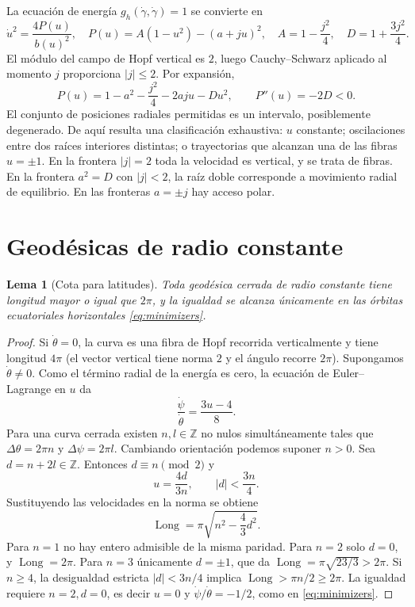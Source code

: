 \documentclass[11pt,a4paper]{article}
\newtheorem{lemma}[theorem]{Lema}
\theoremstyle{remark}\newtheorem{remark}[theorem]{Observación}
\newcommand{\Z}{\mathbb Z}
\newcommand{\Len}{\operatorname{Long}}
\begin{document}
La ecuación de energía $g_h(\dot\gamma,\dot\gamma)=1$ se convierte en
\begin{equation}\label{eq:radial}
\boxed{\dot u^2=\frac{4P(u)}{b(u)^2},\quad P(u)=A(1-u^2)-(a+ju)^2,\quad A=1-\frac{j^2}{4},\quad D=1+\frac{3j^2}{4}.}
\end{equation}
El módulo del campo de Hopf vertical es $2$, luego Cauchy--Schwarz aplicado al momento $j$ proporciona $|j|\leq2$. Por expansión,
\begin{equation}\label{eq:quad}
P(u)=1-a^2-\frac{j^2}{4}-2aju-Du^2,\qquad P''(u)=-2D<0.
\end{equation}
El conjunto de posiciones radiales permitidas es un intervalo, posiblemente degenerado. De aquí resulta una clasificación exhaustiva: $u$ constante; oscilaciones entre dos raíces interiores distintas; o trayectorias que alcanzan una de las fibras $u=\pm1$. En la frontera $|j|=2$ toda la velocidad es vertical, y se trata de fibras. En la frontera $a^2=D$ con $|j|<2$, la raíz doble corresponde a movimiento radial de equilibrio. En las fronteras $a=\pm j$ hay acceso polar.

\section{Geodésicas de radio constante}
\begin{lemma}[Cota para latitudes]\label{lem:lat}
Toda geodésica cerrada de radio constante tiene longitud mayor o igual que $2\pi$, y la igualdad se alcanza únicamente en las órbitas ecuatoriales horizontales \eqref{eq:minimizers}.
\end{lemma}
\begin{proof}
Si $\dot\theta=0$, la curva es una fibra de Hopf recorrida verticalmente y tiene longitud $4\pi$ (el vector vertical tiene norma $2$ y el ángulo recorre $2\pi$). Supongamos $\dot\theta\ne0$. Como el término radial de la energía es cero, la ecuación de Euler--Lagrange en $u$ da
\[
\frac{\dot\psi}{\dot\theta}=\frac{3u-4}{8}.
\]
Para una curva cerrada existen $n,l\in\Z$ no nulos simultáneamente tales que $\Delta\theta=2\pi n$ y $\Delta\psi=2\pi l$. Cambiando orientación podemos suponer $n>0$. Sea $d=n+2l\in\Z$. Entonces $d\equiv n\pmod2$ y
\[
u=\frac{4d}{3n},\qquad |d|<\frac{3n}{4}.
\]
Sustituyendo las velocidades en la norma se obtiene
\[
\Len=\pi\sqrt{n^2-\frac43d^2}.
\]
Para $n=1$ no hay entero admisible de la misma paridad. Para $n=2$ solo $d=0$, y $\Len=2\pi$. Para $n=3$ únicamente $d=\pm1$, que da $\Len=\pi\sqrt{23/3}>2\pi$. Si $n\ge4$, la desigualdad estricta $|d|<3n/4$ implica $\Len>\pi n/2\ge2\pi$. La igualdad requiere $n=2,d=0$, es decir $u=0$ y $\dot\psi/\dot\theta=-1/2$, como en \eqref{eq:minimizers}.
\end{proof}
\end{document}
